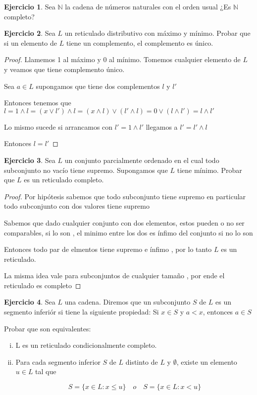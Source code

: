 \documentclass[12pt]{article}
\newcommand{\N}{\mathbb{N}}
\theoremstyle{definition}
\newtheorem{ej}{Ejercicio}
\begin{document}
\begin{ej}
	Sea $\N$ la cadena de números naturales con el orden usual ¿Es $\N$ completo?
\end{ej}

\begin{ej}
Sea $L$ un reticulado distributivo con máximo y mínimo. Probar que si un elemento de $L$ tiene un complemento, el complemento es único.
\begin{proof}
	Llamemos 1 al máximo y 0 al mínimo. Tomemos cualquier elemento de $L$ y veamos que tiene complemento único.

	Sea $a \in L$ supongamos que tiene dos complementos $l$ y $l'$

	Entonces tenemos que $l = 1 \land l = (x \lor l') \land l = (x\land l) \lor (l'\land l) = 0 \lor (l \land l' ) = l \land l'$

	Lo mismo sucede si arrancamos con $l' = 1 \land l'$ llegamos a $l'= l'\land l$

	Entonces $l = l'$
\end{proof}
\end{ej}

\begin{ej}
	Sea $L$ un conjunto parcialmente ordenado en el cual todo subconjunto no vacío tiene supremo. Supongamos que $L$ tiene mínimo. Probar que $L$ es un reticulado completo.

	\begin{proof}
		Por hipótesis sabemos que todo subconjunto tiene supremo en particular todo subconjunto con dos valores tiene supremo

		Sabemos que dado cualquier conjunto con dos elementos, estos pueden o no ser comparables, si lo son , el minimo entre los dos es ínfimo del conjunto si no lo son 

		Entonces todo par de elmentos tiene supremo e ínfimo , por lo tanto $L$ es un reticulado. 

		La misma idea vale para subconjuntos de cualquier tamaño , por ende el reticulado es completo
	\end{proof}
\end{ej}

\begin{ej}	
	Sea $L$ una cadena. Diremos que un subconjunto $S$ de $L$ es un segmento inferiór si tiene la siguiente propiedad: Si $x \in S$ y $a < x$, entonces $a \in S$

	Probar que son equivalentes:
	\begin{enumerate}[i.]
		\item L es un reticulado condicionalmente completo.
		\item Para cada segmento inferior $S$ de $L$ distinto de $L$ y $\emptyset$, existe un elemento $u \in L$ tal que

			$$ S = \{x \in L : x \leq u\} \quad o \quad S = \{ x \in L : x < u\}$$
	\end{enumerate}
\end{ej}
\end{document}

